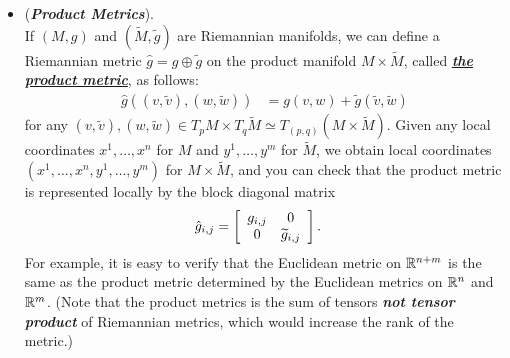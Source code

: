 \documentclass[11pt]{article}
\begin{document}
\begin{itemize}
\item \begin{example}(\emph{\textbf{Product Metrics}}). \\
If $(M,g)$ and $(\widetilde{M},\widetilde{g})$ are Riemannian manifolds, we can define a Riemannian metric $\hat{g} = g \oplus \tilde{g}$ on the product manifold
$M \times \widetilde{M}$, called \underline{\emph{\textbf{the product metric}}}, as follows:
\begin{align}
\hat{g}((v,\widetilde{v}), (w, \widetilde{w})) &= g(v,w) + \widetilde{g}(\widetilde{v},\widetilde{w}) \label{eqn: riemannian_product_metric}
\end{align} for any $(v,\widetilde{v}), (w, \widetilde{w}) \in T_{p}M \times T_{q}\widetilde{M} \simeq T_{(p,q)}(M\times \widetilde{M})$. Given any local coordinates $x^1,\ldots, x^n$ for $M$ and $y^1,\ldots, y^m$ for $\widetilde{M} $, we obtain local coordinates $(x^1,\ldots, x^n, y^1,\ldots, y^m)$ for $M \times \widetilde{M}$, and you can check that the product metric is represented locally by the block diagonal matrix
\begin{align*}
\hat{g}_{i,j} &= 
\left[\begin{array}{cc}
g_{i,j} & 0\\
0 & \widetilde{g}_{i,j}
\end{array}\right].
\end{align*} For example, it is easy to verify that the Euclidean metric on ${\mathbb R}^{n+m}$ is the same as the product metric determined by the Euclidean metrics on ${\mathbb R}^n$ and ${\mathbb R}^m$.
(Note that the product metrics is the sum of tensors \textbf{\emph{not tensor product}} of Riemannian metrics, which would increase the rank of the metric.)
\end{example}


\end{itemize}
\end{document}
